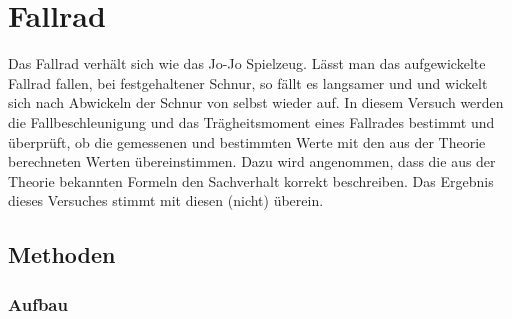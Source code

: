\section{Fallrad} %
	
	Das Fallrad verhält sich wie das Jo-Jo Spielzeug. Lässt man das aufgewickelte Fallrad fallen, bei festgehaltener Schnur, so fällt es langsamer und und wickelt sich nach Abwickeln der Schnur von selbst wieder auf. In diesem Versuch werden die Fallbeschleunigung und das Trägheitsmoment eines Fallrades bestimmt und überprüft, ob die gemessenen und bestimmten Werte mit den aus der Theorie berechneten Werten übereinstimmen. Dazu wird angenommen, dass die aus der Theorie bekannten Formeln den Sachverhalt korrekt beschreiben. Das Ergebnis dieses Versuches stimmt mit diesen (nicht) überein. %
	
	\subsection{Methoden}
		
		\subsubsection{Aufbau}
		

